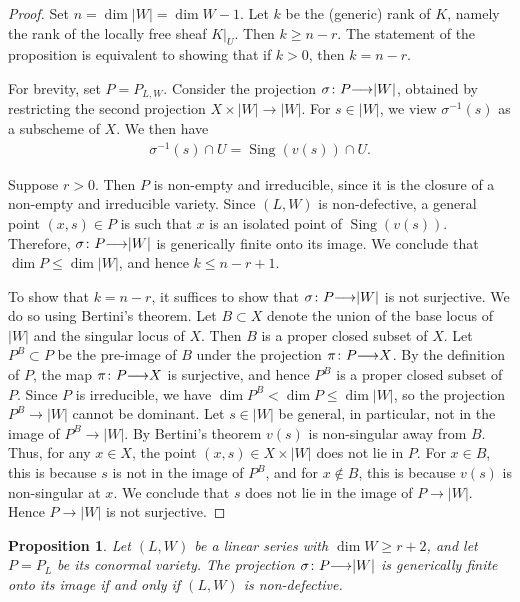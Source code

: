 \documentclass[11pt,reqno]{amsart}
\theoremstyle{plain}
\newtheorem{proposition}[theorem]{Proposition}
\theoremstyle{definition}
\theoremstyle{remark}
\numberwithin{equation}{section}
\DeclareMathOperator{\sing}{Sing}
\renewcommand{\to}{{\longrightarrow}}
\numberwithin{equation}{section}
\begin{document}
\begin{proof}
  Set $n = \dim |W| = \dim W - 1$.
  Let $k$ be the (generic) rank of $K$, namely the rank of the locally free sheaf $K|_U$.
  Then $k \geq n-r$.
  The statement of the proposition is equivalent to showing that if $k > 0$, then $k = n-r$.

  For brevity, set $P = P_{L,W}$.
  Consider the projection $\sigma \from P \to |W|$, obtained by restricting the second projection $X \times |W| \to |W|$.
  For $s \in |W|$, we view $\sigma^{-1}(s)$ as a subscheme of $X$.
  We then have
  \begin{align*}
    \sigma^{-1}(s) \cap U = \sing(v(s)) \cap U.
  \end{align*}

  Suppose $r>0$.
  Then $P$ is non-empty and irreducible, since it is the closure of a non-empty and irreducible variety.
  Since $(L,W)$ is non-defective, a general point $(x,s) \in P$ is such that $x$ is an isolated point of $\sing(v(s))$.
  Therefore, $\sigma \from P \to |W|$ is generically finite onto its image.
  We conclude that $\dim P \leq \dim |W|$, and hence $k \leq n-r+1$.

  To show that $k = n-r$, it suffices to show that $\sigma \from P \to |W|$ is not surjective.
  We do so using Bertini's theorem.
  Let $B \subset X$ denote the union of the base locus of $|W|$ and the singular locus of $X$.
  Then $B$ is a proper closed subset of $X$.
  Let $P^B \subset P$ be the pre-image of $B$ under the projection $\pi \from P \to X$.
  By the definition of $P$, the map $\pi \from P \to X$ is surjective, and hence $P^B$ is a proper closed subset of $P$.
  Since $P$ is irreducible, we have $\dim P^B < \dim P \leq \dim |W|$, so the projection $P^B \to |W|$ cannot be dominant.
  Let $s \in |W|$ be general, in particular, not in the image of $P^B \to |W|$.
  By Bertini's theorem $v(s)$ is non-singular away from $B$.
  Thus, for any $x \in X$, the point $(x, s) \in X \times |W|$ does not lie in $P$.
  For $x \in B$, this is because $s$ is not in the image of $P^B$, and for $x \not \in B$, this is because $v(s)$ is non-singular at $x$.
  We conclude that $s$ does not lie in the image of $P \to |W|$.
  Hence $P \to |W|$ is not surjective.
\end{proof} 

\begin{proposition}
  \label{prop:dimensionCriterion}
  Let $(L, W)$ be a linear series with $\dim W \geq r+2$, and let $P = P_L$ be its conormal variety.
  The projection $\sigma\from P \to |W|$ is generically finite onto its image if and only if $(L, W)$ is non-defective. 
\end{proposition}
\end{document}
